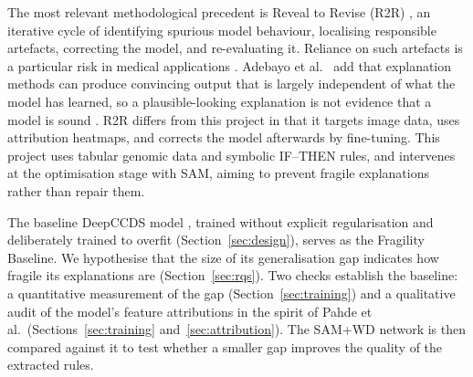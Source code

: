The most relevant methodological precedent is Reveal to Revise (R2R) \citep{pahde2023}, an iterative cycle of identifying spurious model behaviour, localising responsible artefacts, correcting the model, and re-evaluating it. Reliance on such artefacts is a particular risk in medical applications \citep{pahde2023,klauschen2024}. Adebayo et al.\ \citeyearpar{adebayo2018} add that explanation methods can produce convincing output that is largely independent of what the model has learned, so a plausible-looking explanation is not evidence that a model is sound \citep{adebayo2018}. R2R differs from this project in that it targets image data, uses attribution heatmaps, and corrects the model afterwards by fine-tuning. This project uses tabular genomic data and symbolic IF--THEN rules, and intervenes at the optimisation stage with SAM, aiming to prevent fragile explanations rather than repair them.

The baseline DeepCCDS model \citep{wu2025}, trained without explicit regularisation and deliberately trained to overfit (Section~\ref{sec:design}), serves as the Fragility Baseline. We hypothesise that the size of its generalisation gap indicates how fragile its explanations are (Section~\ref{sec:rqs}). Two checks establish the baseline: a quantitative measurement of the gap (Section~\ref{sec:training}) and a qualitative audit of the model's feature attributions in the spirit of Pahde et al.\ (Sections~\ref{sec:training} and~\ref{sec:attribution}). The SAM+WD network is then compared against it to test whether a smaller gap improves the quality of the extracted rules.